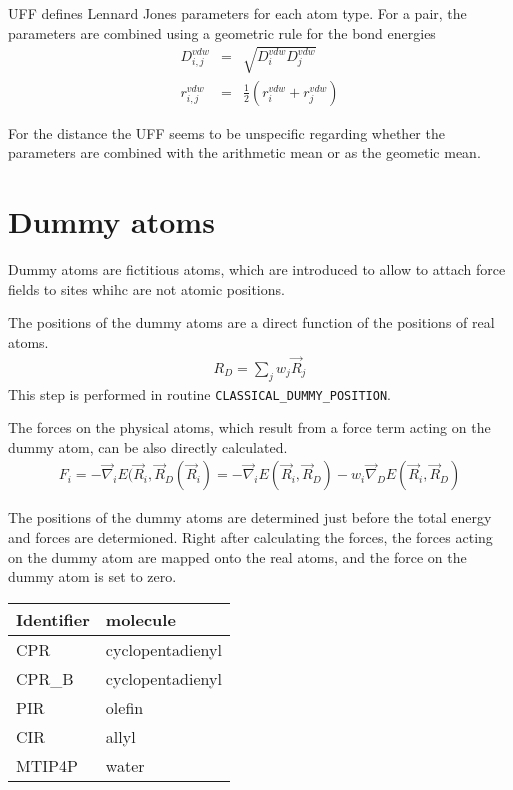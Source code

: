 \documentclass[11pt,a4paper]{report}
\begin{document}
UFF defines Lennard Jones parameters for each atom type. For a pair,
the parameters are combined using a geometric rule for the bond energies
\begin{eqnarray}
D^{vdw}_{i,j}&=&\sqrt{D^{vdw}_{i}D^{vdw}_{j}}
\\
r^{vdw}_{i,j}&=&\frac{1}{2}\left(r^{vdw}_i+r^{vdw}_j\right)
\end{eqnarray}

For the distance the UFF seems to be unspecific regarding whether the
parameters are combined with the arithmetic mean or as the geometic
mean.



\section{Dummy atoms}
Dummy atoms are fictitious atoms, which are introduced to allow to
attach force fields to sites whihc are not atomic positions.

The positions of the dummy atoms are a direct function of the
positions of real atoms.
\begin{eqnarray}
R_D=\sum_j w_j \vec{R}_j
\end{eqnarray}
This step is performed in routine \verb|CLASSICAL_DUMMY_POSITION|.

The forces on the physical atoms, which result from a force term
acting on the dummy atom, can be also directly calculated.
\begin{eqnarray}
F_i=-\vec{\nabla}_iE(\vec{R}_i,\vec{R}_D(\vec{R}_i)=
-\vec{\nabla}_iE(\vec{R}_i,\vec{R}_D)
-w_i\vec{\nabla}_DE(\vec{R}_i,\vec{R}_D)
\end{eqnarray}

The positions of the dummy atoms are determined just before the total
energy and forces are determioned. Right after calculating the forces,
the forces acting on the dummy atom are mapped onto the real atoms,
and the force on the dummy atom is set to zero.






\begin{tabular}{|l|l|}
\hline
\hline
Identifier & molecule \\
\hline
CPR   & cyclopentadienyl\\
CPR\_B & cyclopentadienyl\\
PIR    & olefin\\
CIR    & allyl\\
MTIP4P & water\\
\hline
\end{tabular}
\end{document}
